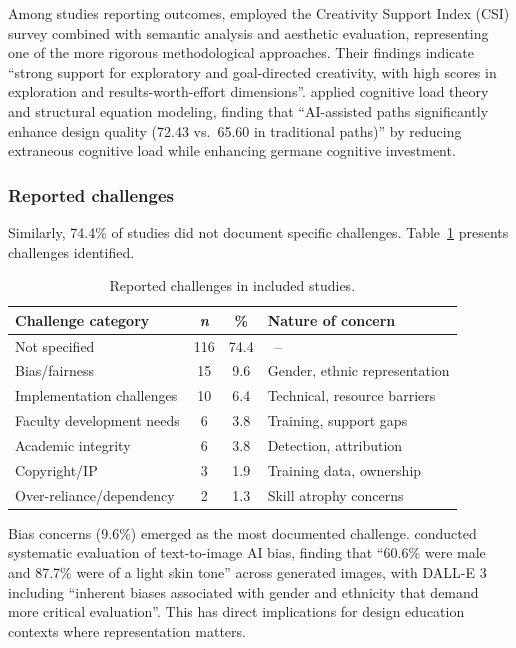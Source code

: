 \documentclass[ed]{acnsart}
\begin{document}
Among studies reporting outcomes, \citet{MedelVera2025} employed the Creativity Support Index (CSI) survey combined with semantic analysis and aesthetic evaluation, representing one of the more rigorous methodological approaches. Their findings indicate ``strong support for exploratory and goal-directed creativity, with high scores in exploration and results-worth-effort dimensions''. \citet{Dong2025} applied cognitive load theory and structural equation modeling, finding that ``AI-assisted paths significantly enhance design quality (72.43 vs.\ 65.60 in traditional paths)'' by reducing extraneous cognitive load while enhancing germane cognitive investment.

\subsubsection{Reported challenges}

Similarly, 74.4\% of studies did not document specific challenges. Table~\ref{tab:challenges} presents challenges identified.

\begin{table}[htbp]
\centering
\caption{Reported challenges in included studies.}
\label{tab:challenges}
\small
\begin{tabular}{@{}lccl@{}}
\toprule
\hfill \textbf{Challenge category} & \textbf{\textit{n}} & \textbf{\%} & \hfill \textbf{Nature of concern} \\
\midrule
Not specified & 116 & 74.4 & ~--  \\
Bias/fairness & 15 & 9.6 & Gender, ethnic representation \\
Implementation challenges & 10 & 6.4 & Technical, resource barriers \\
Faculty development needs & 6 & 3.8 & Training, support gaps \\
Academic integrity & 6 & 3.8 & Detection, attribution \\
Copyright/IP & 3 & 1.9 & Training data, ownership \\
Over-reliance/dependency & 2 & 1.3 & Skill atrophy concerns \\
\bottomrule
\end{tabular}
\end{table}

Bias concerns (9.6\%) emerged as the most documented challenge. \citet{Currie2024} conducted systematic evaluation of text-to-image AI bias, finding that ``60.6\% were male and 87.7\% were of a light skin tone'' across generated images, with DALL-E 3 including ``inherent biases associated with gender and ethnicity that demand more critical evaluation''. This has direct implications for design education contexts where representation matters.
\end{document}
